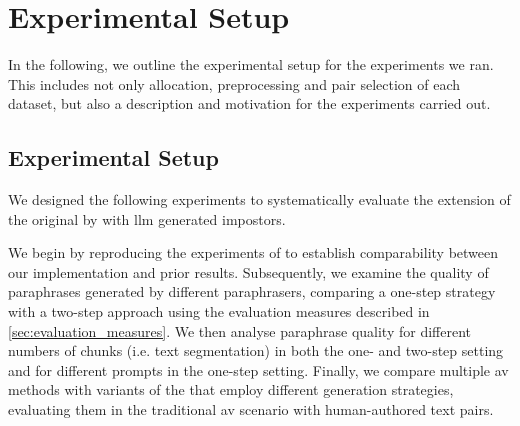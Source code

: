 \chapter{Experimental Setup}
\label{chap:experimental_setup}

In the following, we outline the experimental setup for the experiments we ran.
This includes not only allocation, preprocessing and pair selection of each dataset, but also a description and motivation for the experiments carried out.






\section{Experimental Setup}
\label{sec:experimental_setup}

We designed the following experiments to systematically evaluate the extension of the original \impAppr{} by \citet{koppel_determining_2014} with \ac{llm} generated impostors. 

We begin by reproducing the experiments of \citet{koppel_determining_2014} to establish comparability between our implementation and prior results.
Subsequently, we examine the quality of paraphrases generated by different paraphrasers, comparing a one-step strategy with a two-step approach using the evaluation measures described in \autoref{sec:evaluation_measures}.
We then analyse paraphrase quality for different numbers of chunks (i.e. text segmentation) in both the one- and two-step setting and for different prompts in the one-step setting.
Finally, we compare multiple \ac{av} methods with variants of the \impAppr{} that employ different \imp{} generation strategies, evaluating them in the traditional \ac{av} scenario with human-authored text pairs.









% 

% 

% 








